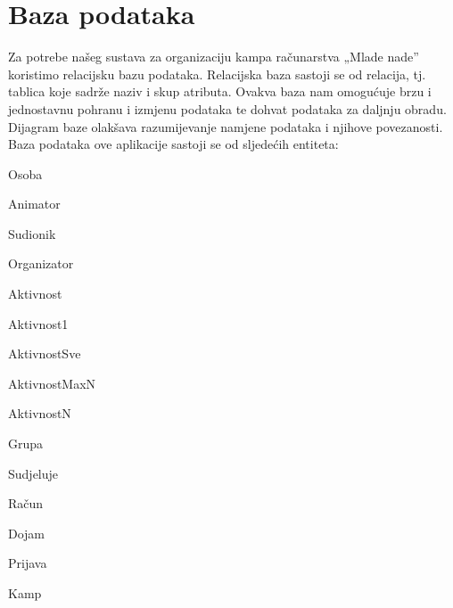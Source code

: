 		
		\section{Baza podataka}
			
Za potrebe našeg sustava za organizaciju kampa računarstva „Mlade nade” koristimo relacijsku bazu podataka. Relacijska baza sastoji se od relacija, tj. tablica koje sadrže naziv i skup atributa. Ovakva baza nam omogućuje brzu i jednostavnu pohranu i izmjenu podataka te dohvat podataka za daljnju obradu. Dijagram baze olakšava razumijevanje namjene podataka i njihove povezanosti.\\
Baza podataka ove aplikacije sastoji se od sljedećih entiteta:
\begin{packed_item}
	\item Osoba
	\begin{packed_item}
		\item Animator
		\item Sudionik
		\item Organizator
	\end{packed_item}
	\item Aktivnost
	\begin{packed_item}
		\item Aktivnost1
		\item AktivnostSve
		\item AktivnostMaxN
		\item AktivnostN
	\end{packed_item}
	\item Grupa
	\item Sudjeluje
	\item Račun
	\item Dojam
	\item Prijava
	\item Kamp
\end{packed_item} 
